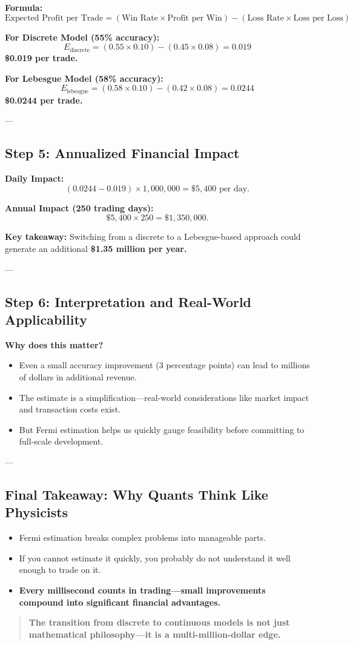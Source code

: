 \textbf{Formula:}
\[
\text{Expected Profit per Trade} = (\text{Win Rate} \times \text{Profit per Win}) - (\text{Loss Rate} \times \text{Loss per Loss})
\]

\textbf{For Discrete Model (55\% accuracy):}
\[
E_{\text{discrete}} = (0.55 \times 0.10) - (0.45 \times 0.08) = 0.019
\]
\textbf{\$0.019 per trade.}

\textbf{For Lebesgue Model (58\% accuracy):}
\[
E_{\text{lebesgue}} = (0.58 \times 0.10) - (0.42 \times 0.08) = 0.0244
\]
\textbf{\$0.0244 per trade.}

---

\subsection{Step 5: Annualized Financial Impact}

\textbf{Daily Impact:}
\[
(0.0244 - 0.019) \times 1,000,000 = \$5,400 \text{ per day}.
\]

\textbf{Annual Impact (250 trading days):}
\[
\$5,400 \times 250 = \$1,350,000.
\]

\textbf{Key takeaway:} Switching from a discrete to a Lebesgue-based approach could generate an additional \textbf{\$1.35 million per year.}

---

\subsection{Step 6: Interpretation and Real-World Applicability}

\textbf{Why does this matter?}
\begin{itemize}
    \item Even a small accuracy improvement (3 percentage points) can lead to millions of dollars in additional revenue.
    \item The estimate is a simplification—real-world considerations like market impact and transaction costs exist.
    \item But Fermi estimation helps us quickly gauge feasibility before committing to full-scale development.
\end{itemize}

---

\subsection{Final Takeaway: Why Quants Think Like Physicists}

\begin{itemize}
    \item Fermi estimation breaks complex problems into manageable parts.
    \item If you cannot estimate it quickly, you probably do not understand it well enough to trade on it.
    \item \textbf{Every millisecond counts in trading—small improvements compound into significant financial advantages.}
\end{itemize}

\begin{quote}
\textbf{The transition from discrete to continuous models is not just mathematical philosophy—it is a multi-million-dollar edge.}
\end{quote}

